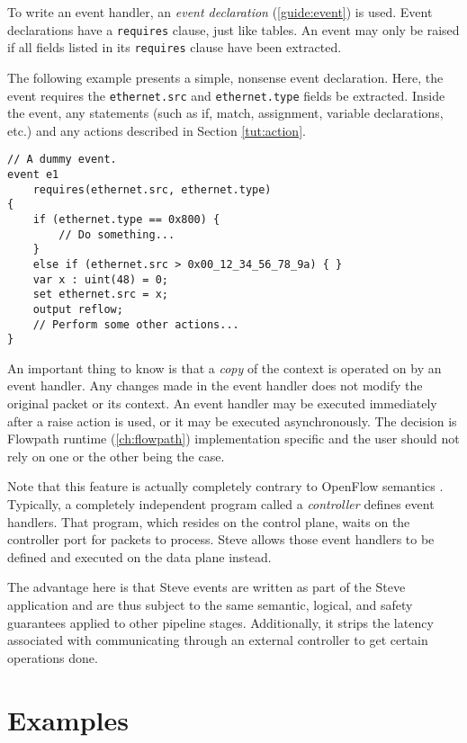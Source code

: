 To write an event handler, an \textit{event declaration}
(\ref{guide:event}) is used. Event declarations have a \texttt{requires} clause, just
like tables. An event may only be raised if all fields listed in its
\texttt{requires} clause have been extracted.

The following example presents a simple, nonsense event declaration. Here,
the event requires the \texttt{ethernet.src} and \texttt{ethernet.type} fields
be extracted. Inside the event, any statements (such as if, match,
assignment, variable declarations, etc.) and any actions described in Section
\ref{tut:action}.

\begin{codepage}
\begin{lstlisting}
// A dummy event.
event e1
	requires(ethernet.src, ethernet.type)
{
	if (ethernet.type == 0x800) {
		// Do something...
	}
	else if (ethernet.src > 0x00_12_34_56_78_9a) { }
	var x : uint(48) = 0;
	set ethernet.src = x;
	output reflow;
	// Perform some other actions...
}
\end{lstlisting}
\end{codepage}

An important thing to know is that a \textit{copy} of the context is operated on
by an event handler. Any changes made in the event handler does not modify the
original packet or its context. An event handler may be executed immediately
after a raise action is used, or it may be executed asynchronously. The decision
is Flowpath runtime (\ref{ch:flowpath}) implementation specific and the user should not
rely on one or the other being the case.

Note that this feature is actually completely contrary to OpenFlow semantics
\cite{openflow_spec}. Typically, a completely independent program called a \textit{controller} defines event
handlers. That program, which resides on the control plane, waits on the controller port for packets to process.
Steve allows those event handlers to be defined and executed on the data plane instead.

The advantage here is that Steve events are written as part of the Steve
application and are thus subject to the same semantic, logical, and safety
guarantees applied to other pipeline stages. Additionally, it strips the latency associated with communicating through an external controller to get certain operations done.

\section{Examples} \label{tut:examples}

